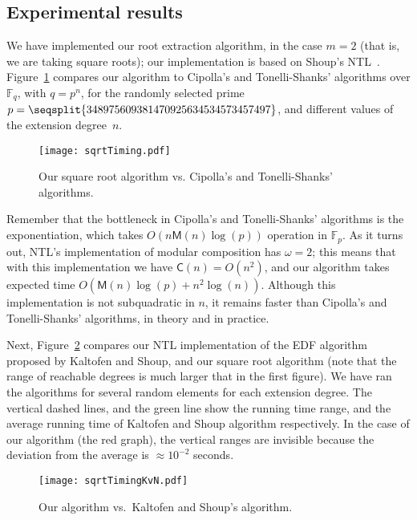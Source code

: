 \documentclass[12pt]{article}
\theoremstyle{plain}
\theoremstyle{definition}
\def\F{\mathbb{F}}
\def\M{\mathsf{M}}
\def\CC{\mathsf{C}}
\newcounter{algorithm}
\begin{document}
\subsection{Experimental results}
We have implemented our root extraction algorithm, in the case $m=2$
(that is, we are taking square roots); our implementation is based on
Shoup's NTL~\cite{NTL2009}. Figure~\ref{figure:sqrtTiming} compares
our algorithm to Cipolla's and Tonelli-Shanks' algorithms over $\F_q$,
with $q = p^n$, for the randomly selected prime $p =
\seqsplit{348975609381470925634534573457497}$, and different values of
the extension degree~$n$. 

\begin{figure}[ht]
\begin{center}
\texttt{[image: sqrtTiming.pdf]}
\end{center}
\caption{\small Our square root algorithm vs. Cipolla's and
  Tonelli-Shanks' algorithms.}
\label{figure:sqrtTiming}
\end{figure}

Remember that the bottleneck in Cipolla's and Tonelli-Shanks'
algorithms is the exponentiation, which takes $O(n\M(n)\log(p))$
operation in $\F_p$. As it turns out, NTL's implementation of modular
composition has $\omega=2$; this means that with this implementation
we have $\CC(n)=O(n^2)$, and our algorithm takes expected time
$O(\M(n)\log(p)+n^2 \log(n))$. Although this implementation is not
subquadratic in $n$, it remains faster than Cipolla's and
Tonelli-Shanks' algorithms, in theory and in practice.

Next, Figure~\ref{figure:sqrtTimingKvN} compares our NTL
implementation of the EDF algorithm proposed by Kaltofen and Shoup,
and our square root algorithm (note that the range of reachable degrees
is much larger that in the first figure). We have ran the algorithms
for several random elements for each extension degree. The vertical dashed
lines, and the green line show the running time range, and the average 
running time of Kaltofen and Shoup algorithm respectively. In the case of 
our algorithm (the red graph), the vertical ranges are invisible because the 
deviation from the average is $\approx 10^{-2}$ seconds. 

\begin{figure}[ht]
\begin{center}
\texttt{[image: sqrtTimingKvN.pdf]}
\end{center}
\caption{\small Our algorithm vs.\ Kaltofen and Shoup's algorithm.}
\label{figure:sqrtTimingKvN}
\end{figure}
\end{document}
